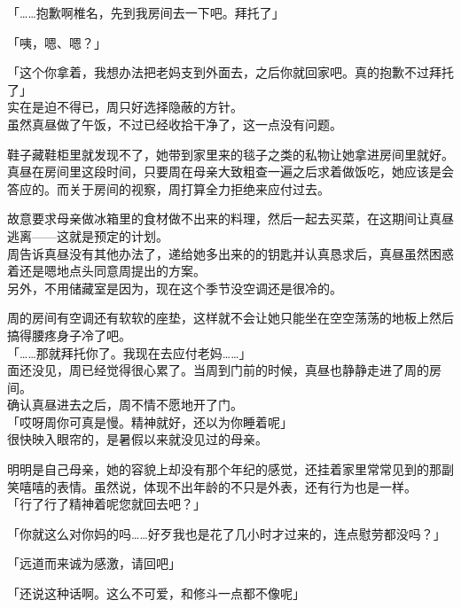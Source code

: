「……抱歉啊椎名，先到我房间去一下吧。拜托了」

「咦，嗯、嗯？」

「这个你拿着，我想办法把老妈支到外面去，之后你就回家吧。真的抱歉不过拜托了」\\

实在是迫不得已，周只好选择隐蔽的方针。\\

虽然真昼做了午饭，不过已经收拾干净了，这一点没有问题。

鞋子藏鞋柜里就发现不了，她带到家里来的毯子之类的私物让她拿进房间里就好。\\

真昼在房间里这段时间，只要周在母亲大致粗查一遍之后求着做饭吃，她应该是会答应的。而关于房间的视察，周打算全力拒绝来应付过去。

故意要求母亲做冰箱里的食材做不出来的料理，然后一起去买菜，在这期间让真昼逃离——这就是预定的计划。\\

周告诉真昼没有其他办法了，递给她多出来的的钥匙并认真恳求后，真昼虽然困惑着还是嗯地点头同意周提出的方案。\\

另外，不用储藏室是因为，现在这个季节没空调还是很冷的。

周的房间有空调还有软软的座垫，这样就不会让她只能坐在空空荡荡的地板上然后搞得腰疼身子冷了吧。\\

「……那就拜托你了。我现在去应付老妈……」\\

面还没见，周已经觉得很心累了。当周到门前的时候，真昼也静静走进了周的房间。\\

确认真昼进去之后，周不情不愿地开了门。\\

「哎呀周你可真是慢。精神就好，还以为你睡着呢」\\

很快映入眼帘的，是暑假以来就没见过的母亲。

明明是自己母亲，她的容貌上却没有那个年纪的感觉，还挂着家里常常见到的那副笑嘻嘻的表情。虽然说，体现不出年龄的不只是外表，还有行为也是一样。\\

「行了行了精神着呢您就回去吧？」

「你就这么对你妈的吗……好歹我也是花了几小时才过来的，连点慰劳都没吗？」

「远道而来诚为感激，请回吧」

「还说这种话啊。这么不可爱，和修斗一点都不像呢」

